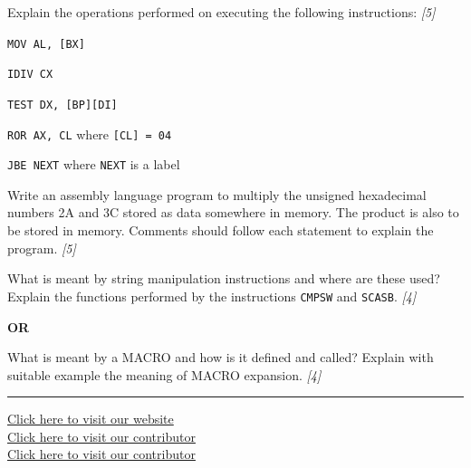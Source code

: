 \documentclass[11pt,a4paper]{article}
\newcommand{\pts}[1]{\hfill   \textit{[#1]}}
\begin{document}
\begin{parts}
  \item Explain the operations performed on executing the following instructions: \pts{5}
  
\begin{parts}
    \item   \texttt{MOV AL, [BX]}
    \item   \texttt{IDIV CX}
    \item   \texttt{TEST DX, [BP][DI]}
    \item   \texttt{ROR AX, CL} where   \texttt{[CL] = 04}
    \item   \texttt{JBE NEXT} where   \texttt{NEXT} is a label
  \end{parts}
  \item Write an assembly language program to multiply the unsigned hexadecimal numbers 2A and 3C stored as data somewhere in memory. The product is also to be stored in memory. Comments should follow each statement to explain the program. \pts{5}
  \item What is meant by string manipulation instructions and where are these used? Explain the functions performed by the instructions   \texttt{CMPSW} and   \texttt{SCASB}. \pts{4}
\end{parts}
\centerline{   \textbf{OR}}
What is meant by a MACRO and how is it defined and called? Explain with suitable example the meaning of MACRO expansion. \pts{4}


\vfill
\rule{\linewidth}{0.4pt}

\begin{center}\small
\href{https://bhu-exam.vercel.app/}{Click here to visit our website}\\[4pt]\href{https://me-aryan.vercel.app/}{Click here to visit our contributor}\\[4pt]\href{https://quashan-me.vercel.app/}{Click here to visit our contributor}
\end{center}
\end{document}
